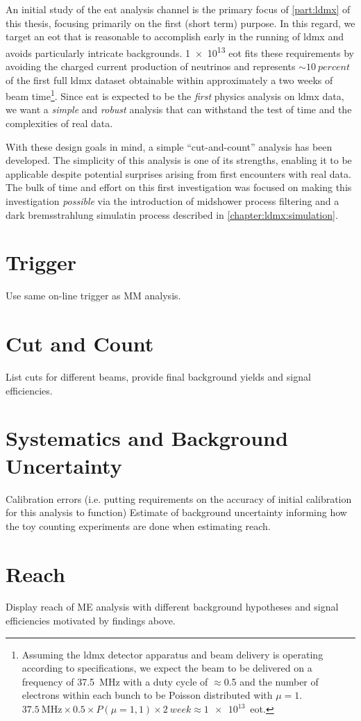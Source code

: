 An initial study of the \ac{eat} analysis channel is the primary focus of \cref{part:ldmx} of this thesis,
focusing primarily on the first (short term) purpose.
In this regard, we target an \ac{eot} that is reasonable
to accomplish early in the running of \ac{ldmx} and avoids particularly intricate backgrounds.
\num{1e13} \ac{eot} fits these requirements by avoiding the charged current production
of neutrinos and represents $\sim\qty{10}{percent}$ of the first full \ac{ldmx} dataset
obtainable within approximately a two weeks of beam time\footnote{
	Assuming the \ac{ldmx} detector apparatus and beam delivery is operating according to specifications,
	we expect the beam to be delivered on a frequency of \qty{37.5}{\mega\hertz}
	with a duty cycle of $\approx$\num{0.5} and the number of electrons within each bunch to be
	Poisson distributed with $\mu=1$.
	$\qty{37.5}{\mega\hertz}\times0.5\times P(\mu=1,1) \times\qty{2}{week}\approx\num{1e13}$~\ac{eot}.
}.
Since \ac{eat} is expected to be the \emph{first} physics
analysis on \ac{ldmx} data, we want a \emph{simple} and \emph{robust} analysis that can withstand
the test of time and the complexities of real data.

With these design goals in mind, a simple ``cut-and-count'' analysis has been developed.
The simplicity of this analysis is one of its strengths, enabling it to be applicable
despite potential surprises arising from first encounters with real data.
The bulk of time and effort on this first investigation was focused on making this
investigation \emph{possible} via the introduction of midshower process filtering
and a dark bremsstrahlung simulatin process described in \cref{chapter:ldmx:simulation}.

\section{Trigger}
Use same on-line trigger as MM analysis.

\section{Cut and Count}
List cuts for different beams, provide final background yields and signal efficiencies.


\section{Systematics and Background Uncertainty}
Calibration errors (i.e. putting requirements on the accuracy of initial calibration for this analysis to function)
Estimate of background uncertainty informing how the toy counting experiments are done when estimating reach.

\section{Reach}
Display reach of ME analysis with different background hypotheses and signal efficiencies
motivated by findings above.

